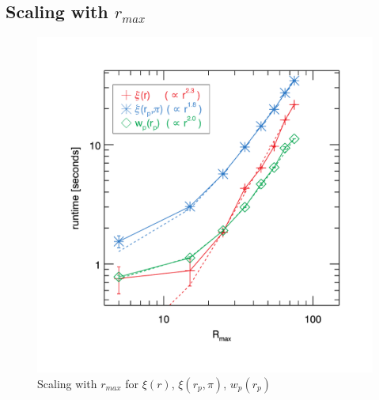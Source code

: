 \documentclass[12pt,titlepage,justified]{article}
\newcommand{\rmax}{\ensuremath{{r_{max}}}\xspace}
\newcommand{\xir}{\ensuremath{{\xi(r)}}\xspace}
\newcommand{\wprp}{\ensuremath{{w_p(r_p)}}\xspace}
\newcommand{\xirppi}{\ensuremath{{\xi(r_p,\pi)}}\xspace}
\begin{document}
\subsection{Scaling with \texorpdfstring{\rmax}{rmax}}
\begin{figure}[htbp]
\includegraphics[clip=true,width=\linewidth]{timings_Mr19_rmax}%
\caption{Scaling with \rmax for \xir, \xirppi, \wprp }
\label{fig:scaling_rmax}
\end{figure}
\end{document}
